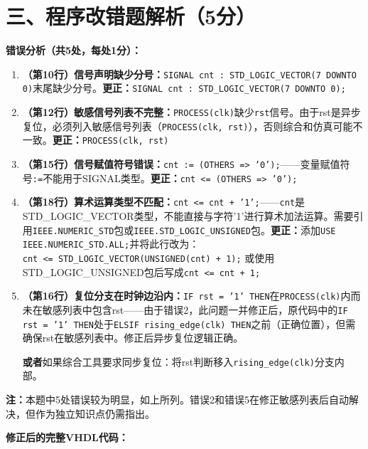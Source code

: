 \section{三、程序改错题解析（5分）}

\textbf{错误分析（共5处，每处1分）：}

\begin{enumerate}[label=\textbf{错误\arabic*：}, leftmargin=*]

\item \textbf{（第10行）信号声明缺少分号：}\texttt{SIGNAL cnt : STD\_LOGIC\_VECTOR(7 DOWNTO 0)}末尾缺少分号。\textbf{更正：}\texttt{SIGNAL cnt : STD\_LOGIC\_VECTOR(7 DOWNTO 0);}

\item \textbf{（第12行）敏感信号列表不完整：}\texttt{PROCESS(clk)}缺少\texttt{rst}信号。由于rst是异步复位，必须列入敏感信号列表（\texttt{PROCESS(clk, rst)}），否则综合和仿真可能不一致。\textbf{更正：}\texttt{PROCESS(clk, rst)}

\item \textbf{（第15行）信号赋值符号错误：}\texttt{cnt := (OTHERS => '0');}——变量赋值符号\verb|:=|不能用于SIGNAL类型。\textbf{更正：}\texttt{cnt <= (OTHERS => '0');}

\item \textbf{（第18行）算术运算类型不匹配：}\texttt{cnt <= cnt + '1';}——\texttt{cnt}是STD\_LOGIC\_VECTOR类型，不能直接与字符'1'进行算术加法运算。需要引用\texttt{IEEE.NUMERIC\_STD}包或\texttt{IEEE.STD\_LOGIC\_UNSIGNED}包。\textbf{更正：}添加\texttt{USE IEEE.NUMERIC\_STD.ALL;}并将此行改为：\\\texttt{cnt <= STD\_LOGIC\_VECTOR(UNSIGNED(cnt) + 1);} 或使用STD\_LOGIC\_UNSIGNED包后写成\texttt{cnt <= cnt + 1;}

\item \textbf{（第16行）复位分支在时钟边沿内：}\texttt{IF rst = '1' THEN}在\texttt{PROCESS(clk)}内而未在敏感列表中包含rst——由于错误2，此问题一并修正后，原代码中的\texttt{IF rst = '1' THEN}处于\texttt{ELSIF rising\_edge(clk) THEN}之前（正确位置），但需确保rst在敏感列表中。修正后异步复位逻辑正确。

\textbf{或者}如果综合工具要求同步复位：将rst判断移入\texttt{rising\_edge(clk)}分支内部。

\end{enumerate}

\textbf{注：}本题中5处错误较为明显，如上所列。错误2和错误5在修正敏感列表后自动解决，但作为独立知识点仍需指出。

\textbf{修正后的完整VHDL代码：}

